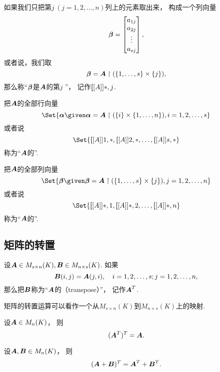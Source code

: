 如果我们只把第\(j\ (j=1,2,\dotsc,n)\)列上的元素取出来，
构成一个列向量\[
	\boldsymbol\beta=\begin{bmatrix}
		a_{1j} \\ a_{2j} \\ \vdots \\ a_{sj}
	\end{bmatrix},
\]
或者说，我们取\[
	\boldsymbol\beta=\boldsymbol{A}\upharpoonright(\{1,\dotsc,s\}\times\{j\}),
\]
那么称“\(\boldsymbol\beta\)是\(\boldsymbol{A}\)的第\(j\) ”，
记作\(\boldsymbol[[A]]{*,j}\).

把\(\boldsymbol{A}\)的全部行向量\[
	\Set{ \vb\alpha \given \vb\alpha=\vb{A}\SetRestrict(\{i\}\times\{1,\dotsc,n\}), i=1,2,\dotsc,s }
\]或者说\[
	\Set{\MatrixEntry\vb{A}{1,*},\MatrixEntry\vb{A}{2,*},\dotsc,\MatrixEntry\vb{A}{s,*}}
\]
称为“\(\boldsymbol{A}\)的”.

把\(\boldsymbol{A}\)的全部列向量\[
	\Set{ \vb\beta \given \vb\beta=\vb{A}\SetRestrict(\{1,\dotsc,s\}\times\{j\}), j=1,2,\dotsc,n }
\]或者说\[
	\Set{\MatrixEntry\vb{A}{*,1},\MatrixEntry\vb{A}{*,2},\dotsc,\MatrixEntry\vb{A}{*,n}}
\]
称为“\(\boldsymbol{A}\)的”.

\subsection{矩阵的转置}
\begin{definition}
设\(\boldsymbol{A}\in M_{s \times n}(K),
\boldsymbol{B}\in M_{n \times s}(K)\).
如果\[
	\boldsymbol{B}(i,j)=\boldsymbol{A}(j,i),
	\quad i=1,2,\dotsc,s;j=1,2,\dotsc,n,
\]
那么把\(\boldsymbol{B}\)称为“\(\boldsymbol{A}\)的（transpose）”，
记作\(\boldsymbol{A}^T\).
\end{definition}
\begin{remark}
矩阵的转置运算可以看作一个从\(M_{s \times n}(K)\)到\(M_{n \times s}(K)\)上的映射.
\end{remark}

\begin{property}\label{theorem:矩阵的转置.性质1}
设\(\boldsymbol{A} \in M_n(K)\)，
则\begin{equation}
	(\boldsymbol{A}^T)^T = \boldsymbol{A}.
\end{equation}
\end{property}

\begin{property}\label{theorem:矩阵的转置.性质2}
设\(\boldsymbol{A},\boldsymbol{B} \in M_n(K)\)，
则\begin{equation}
	(\boldsymbol{A}+\boldsymbol{B})^T = \boldsymbol{A}^T + \boldsymbol{B}^T.
\end{equation}
\end{property}

